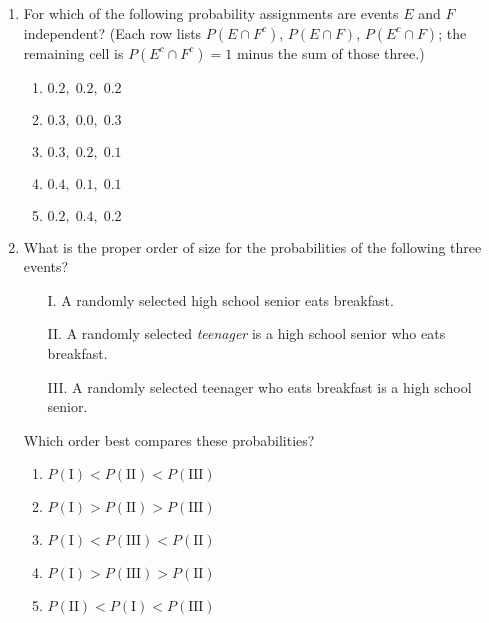 \documentclass{article}
\begin{document}
\begin{enumerate}[label=\textbf{S\arabic*.}]
\item For which of the following probability assignments are events $E$ and $F$
independent? (Each row lists $P(E\cap F^{c})$, $P(E\cap F)$, $P(E^{c}\cap F)$;
the remaining cell is $P(E^{c}\cap F^{c})=1$ minus the sum of those three.)
\begin{enumerate}
  \item $0.2,\;0.2,\;0.2$
  \item $0.3,\;0.0,\;0.3$
  \item $0.3,\;0.2,\;0.1$
  \item $0.4,\;0.1,\;0.1$
  \item $0.2,\;0.4,\;0.2$
\end{enumerate}

\item What is the proper order of size for the probabilities of the following three events?
\begin{itemize}
  \item[I.] A randomly selected high school senior eats breakfast.
  \item[II.] A randomly selected \emph{teenager} is a high school senior who eats breakfast.
  \item[III.] A randomly selected teenager who eats breakfast is a high school senior.
\end{itemize}
Which order best compares these probabilities?
\begin{enumerate}
  \item $P(\text{I})<P(\text{II})<P(\text{III})$
  \item $P(\text{I})>P(\text{II})>P(\text{III})$
  \item $P(\text{I})<P(\text{III})<P(\text{II})$
  \item $P(\text{I})>P(\text{III})>P(\text{II})$
  \item $P(\text{II})<P(\text{I})<P(\text{III})$
\end{enumerate}

\end{enumerate}
\end{document}
